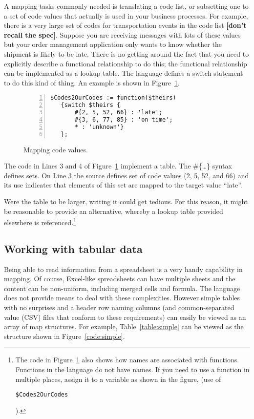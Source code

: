 \documentclass[9pt,letterpaper]{article}
\newcommand{\stt}[1]{\begin{footnotesize}\texttt{#1}\end{footnotesize}}
\begin{document}
A mapping tasks commonly needed is translating a code list, or subsetting one to a set of code values that actually is used in your business processes.
For example, there is a very large set of codes for transportation events in the code list \textbf{[don't recall the spec]}.
Suppose you are receiving messages with lots of these values but your order management application only wants to know whether the shipment is likely to be late.
There is no getting around the fact that you need to explicitly describe a functional relationship to do this; the functional relationship can be implemented as a lookup table.
The language defines a switch statement to do this kind of thing.
An example is shown in Figure~\ref{code:mapping-codes}.

\begin{figure}[H]
    \caption{Mapping code values.}
    \label{code:mapping-codes}
\begin{lstlisting}[frame=tb,numberstyle=\scriptsize,basicstyle=\ttfamily\scriptsize,numbers=left,stepnumber=1,breaklines=true]
  $Codes2OurCodes := function($theirs)
   {switch $theirs {
       #{2, 5, 52, 66} : 'late';
       #{3, 6, 77, 85} : 'on time';
       * : 'unknown'}
   };
\end{lstlisting}
\end{figure}

The code in Lines 3 and 4 of Figure~\ref{code:mapping-codes} implement a table.
The \#\{\ldots\} syntax defines sets.
On Line 3 the source defines set of code values (2, 5, 52, and 66) and its use indicates that elements of this set are mapped to the target value ``late''.

Were the table to be larger, writing it could get tedious.
For this reason, it might be reasonable to provide an alternative, whereby a lookup table provided elsewhere is referenced.\footnote{The code in Figure~\ref{code:mapping-codes} also
  shows how names are associated with functions.
  Functions in the language do not have names.
  If you need to use a function in multiple places, assign it to a variable as shown in the figure, (use of \stt{\$Codes2OurCodes}).}

\subsection{Working with tabular data}

Being able to read information from a spreadsheet is a very handy capability in mapping.
Of course, Excel-like spreadsheets can have multiple sheets and the content can be non-uniform, including merged cells and formula.
The language does not provide means to deal with these complexities.
However simple tables with no surprises and  a header row naming columns (and common-separated value (CSV) files that conform to these requirements) can easily be viewed as an array of map structures.
For example, Table~\ref{table:simple} can be viewed as the structure shown in Figure~\ref{code:simple}.
\end{document}
